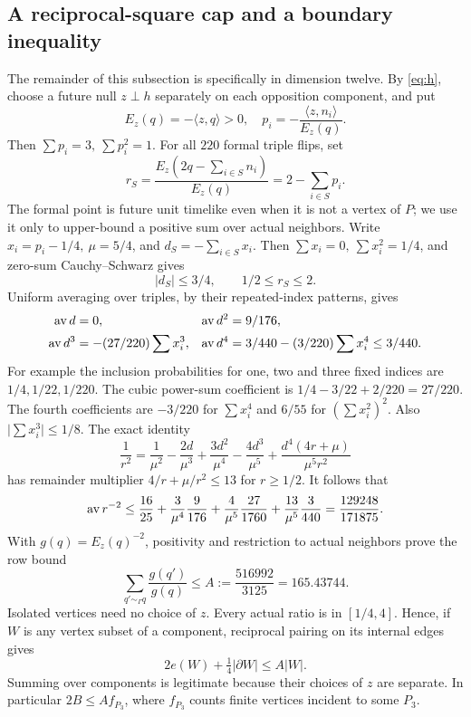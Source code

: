 \documentclass[11pt]{article}
\theoremstyle{definition}\newtheorem{definition}[theorem]{Definition}
\theoremstyle{remark}\newtheorem{remark}[theorem]{Remark}
\newcommand{\ip}[2]{\langle #1,#2\rangle}
\newcommand{\Pthree}{P_3}
\begin{document}
\subsection{A reciprocal-square cap and a boundary inequality}
The remainder of this subsection is specifically in dimension twelve.
By \eqref{eq:h}, choose a future null \(z\perp h\) separately on
each opposition component, and put
\[
 E_z(q)=-\ip{z}{q}>0,\quad
 p_i=-\frac{\ip{z}{n_i}}{E_z(q)}.
\]
Then \(\sum p_i=3,\ \sum p_i^2=1\).
For all \(220\) formal triple flips, set
\[
 r_S=\frac{E_z(2q-\sum_{i\in S}n_i)}{E_z(q)}
      =2-\sum_{i\in S}p_i.
\]
The formal point is future unit timelike even when it is not a vertex
of \(P\); we use it only to upper-bound a positive sum over actual
neighbors. Write \(x_i=p_i-1/4,\ \mu=5/4\), and
\(d_S=-\sum_{i\in S}x_i\). Then
\(\sum x_i=0,\ \sum x_i^2=1/4\), and zero-sum Cauchy--Schwarz gives
\[
 |d_S|\le3/4,\qquad 1/2\le r_S\le2.
\]
Uniform averaging over triples, by their repeated-index patterns,
gives
\begin{align*}
 \mathop{\rm av}d&=0,&
 \mathop{\rm av}d^2&=9/176,\\
 \mathop{\rm av}d^3&=-(27/220)\sum x_i^3,&
 \mathop{\rm av}d^4&=3/440-(3/220)\sum x_i^4\le3/440.
\end{align*}
For example the inclusion probabilities for one, two and three fixed
indices are \(1/4,1/22,1/220\). The cubic power-sum coefficient
is \(1/4-3/22+2/220=27/220\). The fourth coefficients are
\(-3/220\) for \(\sum x_i^4\) and \(6/55\) for
\((\sum x_i^2)^2\). Also \(\lvert\sum x_i^3\rvert\le1/8\).
The exact identity
\[
 \frac1{r^2}=\frac1{\mu^2}-\frac{2d}{\mu^3}
 +\frac{3d^2}{\mu^4}-\frac{4d^3}{\mu^5}
 +\frac{d^4(4r+\mu)}{\mu^5r^2}
\]
has remainder multiplier \(4/r+\mu/r^2\le13\) for \(r\ge1/2\).
It follows that
\[
 \mathop{\rm av}r^{-2}
 \le\frac{16}{25}+\frac3{\mu^4}\frac9{176}
 +\frac4{\mu^5}\frac{27}{1760}
 +\frac{13}{\mu^5}\frac3{440}
 =\frac{129248}{171875}.
\]
With \(g(q)=E_z(q)^{-2}\), positivity and restriction to actual
neighbors prove the row bound
\begin{equation}\label{eq:A}
 \sum_{q'\sim_\Gamma q}\frac{g(q')}{g(q)}
 \le A:=\frac{516992}{3125}=165.43744.
\end{equation}
Isolated vertices need no choice of \(z\). Every actual ratio is in
\([1/4,4]\). Hence, if \(W\) is any vertex subset of a component,
reciprocal pairing on its internal edges gives
\begin{equation}\label{eq:boundary}
 2e(W)+\tfrac14|\partial W|\le A|W|.
\end{equation}
Summing over components is legitimate because their choices of \(z\)
are separate. In particular \(2B\le A f_{\Pthree}\), where
\(f_{\Pthree}\) counts finite vertices incident to some \(\Pthree\).
\end{document}
